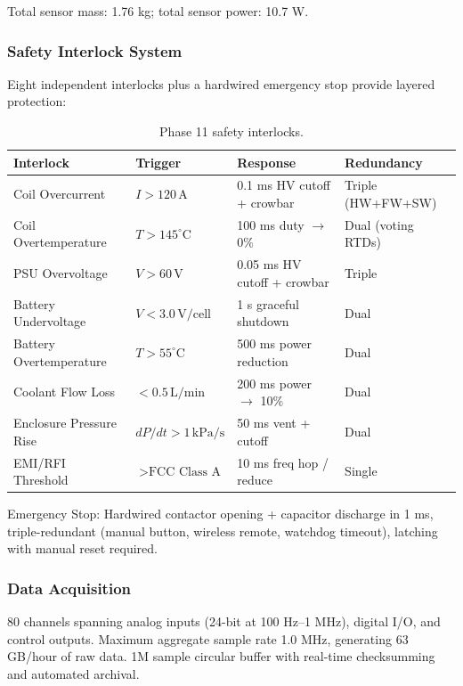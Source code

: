 Total sensor mass: 1.76 kg; total sensor power: 10.7 W.

\subsubsection{Safety Interlock System}

Eight independent interlocks plus a hardwired emergency stop provide layered protection:

\begin{table}[t]
\centering
\caption{Phase 11 safety interlocks.}
\label{tab:phase11-interlocks}
\begin{tabular}{llll}
\hline
Interlock & Trigger & Response & Redundancy \\
\hline
Coil Overcurrent & $I > 120\,\text{A}$ & 0.1 ms HV cutoff + crowbar & Triple (HW+FW+SW) \\
Coil Overtemperature & $T > 145^\circ\text{C}$ & 100 ms duty $\to$ 0\% & Dual (voting RTDs) \\
PSU Overvoltage & $V > 60\,\text{V}$ & 0.05 ms HV cutoff + crowbar & Triple \\
Battery Undervoltage & $V < 3.0\,\text{V/cell}$ & 1 s graceful shutdown & Dual \\
Battery Overtemperature & $T > 55^\circ\text{C}$ & 500 ms power reduction & Dual \\
Coolant Flow Loss & $< 0.5\,\text{L/min}$ & 200 ms power $\to$ 10\% & Dual \\
Enclosure Pressure Rise & $dP/dt > 1\,\text{kPa/s}$ & 50 ms vent + cutoff & Dual \\
EMI/RFI Threshold & $> \text{FCC Class A}$ & 10 ms freq hop / reduce & Single \\
\hline
\end{tabular}
\end{table}

Emergency Stop: Hardwired contactor opening + capacitor discharge in 1 ms, triple-redundant (manual button, wireless remote, watchdog timeout), latching with manual reset required.

\subsubsection{Data Acquisition}

80 channels spanning analog inputs (24-bit at 100 Hz--1 MHz), digital I/O, and control outputs. Maximum aggregate sample rate 1.0 MHz, generating 63 GB/hour of raw data. 1M sample circular buffer with real-time checksumming and automated archival.


